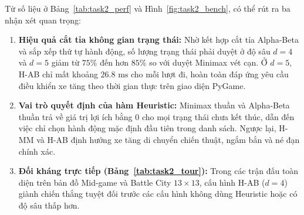 Từ số liệu ở Bảng~\ref{tab:task2_perf} và Hình~\ref{fig:task2_bench}, có thể rút ra ba nhận xét quan trọng:
\begin{enumerate}
    \item \textbf{Hiệu quả cắt tỉa không gian trạng thái:} Nhờ kết hợp cắt tỉa Alpha-Beta và sắp xếp thứ tự hành động, số lượng trạng thái phải duyệt ở độ sâu $d = 4$ và $d = 5$ giảm từ $75\%$ đến hơn $85\%$ so với duyệt Minimax vét cạn. Ở $d = 5$, H-AB chỉ mất khoảng $26.8\text{ ms}$ cho mỗi lượt đi, hoàn toàn đáp ứng yêu cầu điều khiển xe tăng theo thời gian thực trên giao diện PyGame.
    \item \textbf{Vai trò quyết định của hàm Heuristic:} Minimax thuần và Alpha-Beta thuần trả về giá trị lợi ích bằng $0$ cho mọi trạng thái chưa kết thúc, dẫn đến việc chỉ chọn hành động mặc định đầu tiên trong danh sách. Ngược lại, H-MM và H-AB định hướng xe tăng di chuyển chiến thuật, ngắm bắn và né đạn chính xác.
    \item \textbf{Đối kháng trực tiếp (Bảng~\ref{tab:task2_tour}):} Trong các trận đấu toàn diện trên bản đồ Mid-game và Battle City $13\times 13$, cấu hình H-AB ($d=4$) giành chiến thắng tuyệt đối trước các cấu hình không dùng Heuristic hoặc có độ sâu thấp hơn.
\end{enumerate}

